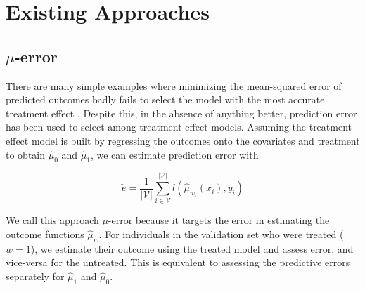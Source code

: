 \section{Existing Approaches}
\label{approaches}

\subsection{$\mu$-error}
\label{sec:pred-error}

There are many simple examples where minimizing the mean-squared error of predicted outcomes badly fails to select the model with the most accurate treatment effect \cite{Rolling:2013kz}. Despite this, in the absence of anything better, prediction error has been used to select among treatment effect models. Assuming the treatment effect model is built by regressing the outcomes onto the covariates and treatment to obtain $\hat\mu_0$ and $\hat\mu_1$, we can estimate prediction error with

\begin{equation}
	\check e = \frac{1}{|\mathcal{V}|} \sum_{i \in \mathcal{V}}^{|\mathcal{V}|}  
	l(\hat \mu_{w_i} (x_i), y_i) 
\label{pred-error}
\end{equation}
 
We call this approach $\mu$-error because it targets the error in estimating the outcome functions $\hat\mu_w$. For individuals in the validation set who were treated ($w=1$), we estimate their outcome using the treated model and assess error, and vice-versa for the untreated. This is equivalent to assessing the predictive errors separately for $\hat\mu_1$ and $\hat\mu_0$. 

